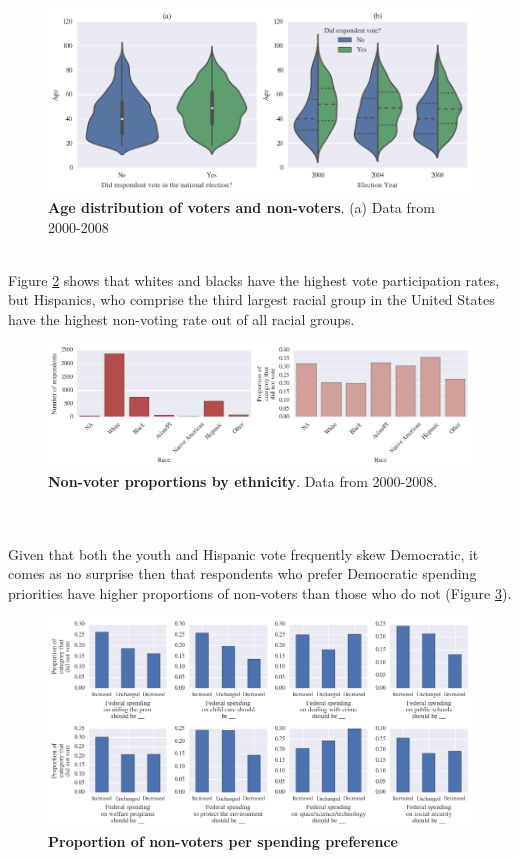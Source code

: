 \documentclass{article}
\begin{document}
	\begin{figure}[h!]
		\begin{center}
			\includegraphics*[width=0.69\linewidth]{age}
			\caption{\textbf{Age distribution of voters and non-voters}. (a) Data from 2000-2008}
			\label{fig:age_distribution}
		\end{center}
	\end{figure}
	\hfill \\
	Figure \ref{fig:categorical_race} shows that whites and blacks have the highest vote participation rates, but Hispanics, who comprise the third largest racial group in the United States have the highest non-voting rate out of all racial groups.
	\begin{figure}[h!]
		\begin{center}
			\includegraphics*[width=1\linewidth]{categorical_race}
			\caption{\textbf{Non-voter proportions by ethnicity}. Data from 2000-2008.}
			\label{fig:categorical_race}
		\end{center}
	\end{figure}
	\hfill \\\\
	Given that both the youth and Hispanic vote frequently skew Democratic, it comes as no surprise then that respondents who prefer Democratic spending priorities have higher proportions of non-voters than those who do not (Figure \ref{fig:ordinal_spending}).
	\begin{figure}[h!]
		\begin{center}
			\includegraphics*[width=1\linewidth]{ordinal_spending}
			\caption{\textbf{Proportion of non-voters per spending preference}}
			\label{fig:ordinal_spending}
		\end{center}
	\end{figure}
\end{document}
